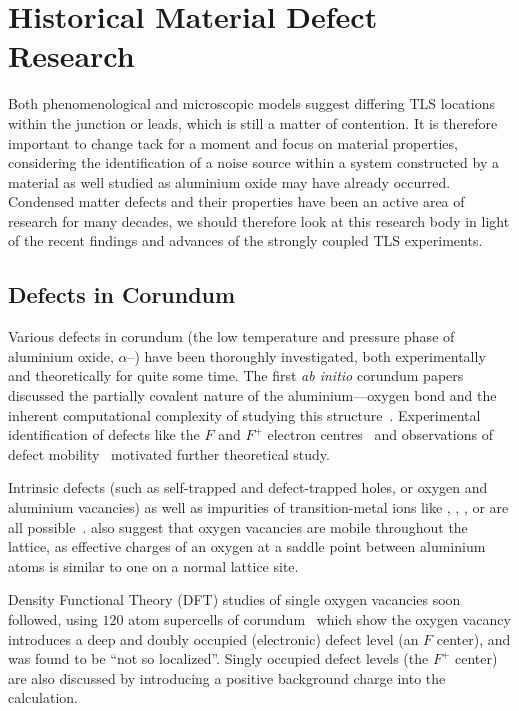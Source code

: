 \section{Historical Material Defect Research}

Both phenomenological and microscopic models suggest differing TLS locations within the junction or leads, which is still a matter of contention.
It is therefore important to change tack for a moment and focus on material properties, considering the identification of a noise source within a system constructed by a material as well studied as aluminium oxide may have already occurred.
Condensed matter defects and their properties have been an active area of research for many decades, we should therefore look at this research body in light of the recent findings and advances of the strongly coupled TLS experiments.

\subsection{Defects in Corundum}\label{sec:cordef}
Various defects in corundum (the low temperature and pressure phase of aluminium oxide, $\alpha$--) have been thoroughly investigated, both experimentally and theoretically for quite some time.
The first \emph{ab initio} corundum papers discussed the partially covalent nature of the aluminium---oxygen bond and the inherent computational complexity of studying this structure~\cite{Causa1987}.
Experimental identification of defects like the $F$
and $F^+$ electron centres~\cite{Kotomin1989} and observations of defect mobility~\cite{Kulis1991} motivated further theoretical study.

Intrinsic defects (such as self-trapped and defect-trapped holes, or oxygen and aluminium vacancies) as well as impurities of transition-metal ions like , , ,  or  are all possible~\cite{Jacobs1994}.
\citeauthor{Jacobs1994} also suggest that oxygen vacancies are mobile throughout the lattice, as effective charges of an oxygen at a saddle point between aluminium atoms is similar to one on a normal lattice site.

Density Functional Theory (DFT) studies of single oxygen vacancies soon followed, using $120$ atom supercells of corundum~\cite{Xu1997} which show the oxygen vacancy introduces a deep and doubly occupied (electronic) defect level (an $F$ center), and was found to be ``not so localized''.
Singly occupied defect levels (the $F^+$ center) are also discussed by introducing a positive background charge into the calculation.

